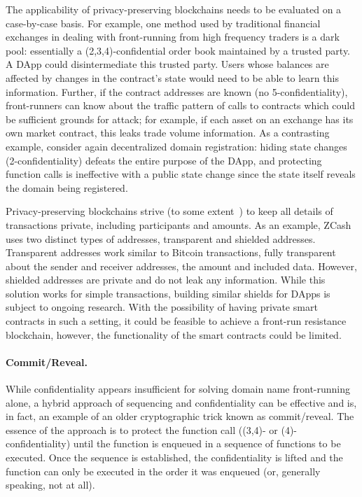 The applicability of privacy-preserving blockchains needs to be evaluated on a case-by-case basis. For example, one method used by traditional financial exchanges in dealing with front-running from high frequency traders is a dark pool: essentially a (2,3,4)-confidential order book maintained by a trusted party. A DApp could disintermediate this trusted party. Users whose balances are affected by changes in the contract's state would need to be able to learn this information. Further, if the contract addresses are known (\ie no 5-confidentiality), front-runners can know about the traffic pattern of calls to contracts which could be sufficient grounds for attack; for example, if each asset on an exchange has its own market contract, this leaks trade volume information. As a contrasting example, consider again decentralized domain registration: hiding state changes (2-confidentiality) defeats the entire purpose of the DApp, and protecting function calls is ineffective with a public state change since the state itself reveals the domain being registered.


Privacy-preserving blockchains strive (to some extent~\cite{MMLN17,kappos2018empirical}) to keep all details of transactions private, including participants and amounts. As an example, ZCash~\cite{hopwood2016zcash} uses two distinct types of addresses, transparent and shielded addresses. Transparent addresses work similar to Bitcoin transactions, fully transparent about the sender and receiver addresses, the amount and included data. However, shielded addresses are private and do not leak any information. While this solution works for simple transactions, building similar shields for DApps is subject to ongoing research. With the possibility of having private smart contracts in such a setting, it could be feasible to achieve a front-run resistance blockchain, however, the functionality of the smart contracts could be limited.


\paragraph{Commit/Reveal.}
\label{sec:comm}

While confidentiality appears insufficient for solving domain name front-running alone, a hybrid approach of sequencing and confidentiality can be effective and is, in fact, an example of an older cryptographic trick known as commit/reveal. The essence of the approach is to protect the function call (\eg (3,4)- or (4)-confidentiality) until the function is enqueued in a sequence of functions to be executed. Once the sequence is established, the confidentiality is lifted and the function can only be executed in the order it was enqueued (or, generally speaking, not at all).

